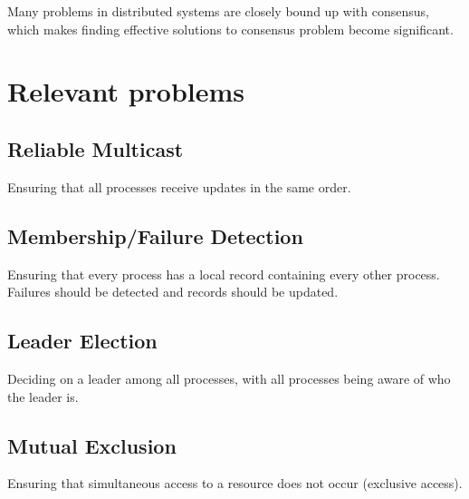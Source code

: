 \documentclass[12pt, a4paper]{article}
\begin{document}
Many problems in distributed systems are closely bound up with consensus, which
makes finding effective solutions to consensus problem become significant.





\section{Relevant problems}


\subsection{Reliable Multicast}

Ensuring that all processes receive updates in the same order.

\subsection{Membership/Failure Detection}

Ensuring that every process has a local record containing every other process.
Failures should be detected and records should be updated.

\subsection{Leader Election}

Deciding on a leader among all processes, with all processes being aware of
who the leader is.

\subsection{Mutual Exclusion}

Ensuring that simultaneous access to a resource does not occur (exclusive
access).
\end{document}
